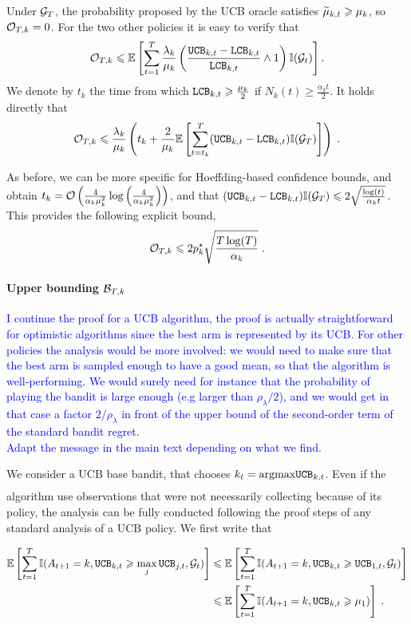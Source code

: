 Under $\mathcal{G}_T$, the probability proposed by the UCB oracle satisfies $\widetilde{\mu}_{k, t}\geqslant \mu_k$, so $\mathcal{O}_{T,k}=0$. For the two other policies it is easy to verify that 
\[ \mathcal{O}_{T,k} \leqslant \mathbb{E}\left[\sum_{t=1}^T \frac{\lambda_k}{\mu_k}\left(\frac{\texttt{UCB}_{k, t}- \texttt{LCB}_{k, t}}{\texttt{LCB}_{k, t}}\wedge 1\right) \mathbb{I}(\mathcal{G}_t)\right].\]
We denote by $t_k$ the time from which $\texttt{LCB}_{k,t}\geqslant \frac{\mu_k}{2}$ if $N_k(t)\geq \frac{\alpha_k t}{2}$. It holds directly that 
\[\mathcal{O}_{T,k} \leqslant \frac{\lambda_k}{\mu_k} \left(t_k + \frac{2}{\mu_k}\mathbb{E}\left[\sum_{t=t_k}^T (\texttt{UCB}_{k, t}- \texttt{LCB}_{k, t}) \mathbb{I}(\mathcal{G}_T)\right] \right) \;. \]

As before, we can be more specific for Hoeffding-based confidence bounds, and obtain $t_k=\mathcal{O}\left(\frac{4}{\alpha_k \mu_k^2}\log\left(\frac{4}{\alpha_k \mu_k^2}\right)\right)$, and that $(\texttt{UCB}_{k, t}- \texttt{LCB}_{k, t}) \mathbb{I}(\mathcal{G}_T) \leqslant 2\sqrt{\frac{\log(t)}{\alpha_k t}}$. This provides the following explicit bound, 
\[ \mathcal{O}_{T,k} \leqslant 2p_k^\star\sqrt{\frac{T\log(T)}{\alpha_k}}  \;. \]

\paragraph{Upper bounding $\mathcal{B}_{T, k}$} \textcolor{blue}{I continue the proof for a UCB algorithm, the proof is actually straightforward for optimistic algorithms since the best arm is represented by its UCB. For other policies the analysis would be more involved: we would need to make sure that the best arm is sampled enough to have a good mean, so that the algorithm is well-performing. We would surely need for instance that the probability of playing the bandit is large enough (e.g larger than $\rho_\lambda/2$), and we would get in that case a factor $2/\rho_\lambda$ in front of the upper bound of the second-order term of the standard bandit regret.\\
Adapt the message in the main text depending on what we find.}

We consider a UCB base bandit, that chooses $k_t = \underset{}{\text{argmax}} \texttt{UCB}_{k, t}$. Even if the algorithm use observations that were not necessarily collecting because of its policy, the analysis can be fully conducted following the proof steps of any standard analysis of a UCB policy.  We first write that

\begin{align*}
\mathbb{E}\left[\sum_{t=1}^T \mathbb{I}(A_{t+1}=k, \texttt{UCB}_{k, t}\geqslant \max_j \texttt{UCB}_{j, t}, \mathcal{G}_t)\right] & \leqslant \mathbb{E}\left[\sum_{t=1}^T \mathbb{I}(A_{t+1}=k, \texttt{UCB}_{k, t}\geqslant \texttt{UCB}_{1, t}, \mathcal{G}_t)\right] \\
& \leqslant \mathbb{E}\left[\sum_{t=1}^T \mathbb{I}(A_{t+1}=k, \texttt{UCB}_{k, t}\geqslant \mu_1)\right] \;. \end{align*}

